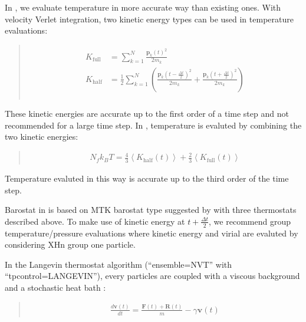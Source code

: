 \documentclass[a4paper,11pt,oneside,english]{sphinxmanual}
\begin{document}
In , we evaluate temperature in more accurate way than existing ones. With velocity Verlet
integration, two kinetic energy types can be used in temperature evaluations:
\begin{quote}

\vspace{-5mm}
\begin{align*}\!\begin{aligned}
K_{\textrm{full}} & = \sum_{k=1}^{N} \frac{\mathbf{p}_{k}\left( t \right) ^2}{2m_{k}}\\
K_{\textrm{half}} & = \frac{1}{2} \sum_{k=1}^{N} \left ( \frac{\mathbf{p}_{k} \left(t - \frac{\Delta t}{2} \right)^2}{2m_{k}} + \frac{\mathbf{p}_{k} \left( t + \frac{\Delta t}{2} \right)^2}{2m_{k}} \right)\\
\end{aligned}\end{align*}
\vspace{-3mm}
\end{quote}

These kinetic energies are accurate up to the first order of a time step and not recommended for a large time step.
In , temperature is evaluted by combining the two kinetic energies:
\begin{quote}

\vspace{-5mm}
\begin{equation*}
\begin{split}N_{f} k_{B} T = \frac{4}{3} \left < K_{\textrm{half}} (t) \right > + \frac{2}{3} \left < K_{\textrm{full}} (t) \right >\end{split}
\end{equation*}
\vspace{-3mm}
\end{quote}

Temperature evaluted in this way is accurate up to the third order of the time step.

Barostat in  is based on MTK barostat type suggested by 
with three thermostats described above. To make use of kinetic energy at \(t + \frac{\Delta t}{2}\),
we recommend group temperature/pressure evaluations where kinetic energy and virial are evaluted by
considering XHn group one particle.

In the Langevin thermostat algorithm (“ensemble=NVT” with
“tpcontrol=LANGEVIN”), every particles are coupled with a viscous background
and a stochastic heat bath :
\begin{quote}

\vspace{-5mm}
\begin{equation*}
\begin{split}\frac{d\mathbf{v}(t)}{dt} = \frac{\mathbf{F}(t)+\mathbf{R}(t)}{m}-\gamma \mathbf{v}(t)\end{split}
\end{equation*}
\vspace{-3mm}
\end{quote}
\end{document}

